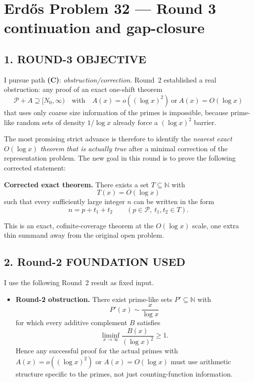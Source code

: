 \section{Erd\H{o}s Problem 32 --- Round 3 continuation and gap-closure}

\subsection{1. ROUND-3 OBJECTIVE}

I pursue path \textbf{(C)}: \emph{obstruction/correction}.  Round~2 established a real obstruction: any proof of an exact one-shift theorem
\[
\mathcal P + A \supseteq [N_0,\infty)
\quad\text{with}\quad A(x)=o((\log x)^2)\ \text{or}\ A(x)=O(\log x)
\]
that uses only coarse size information of the primes is impossible, because prime-like random sets of density $1/\log x$ already force a $(\log x)^2$ barrier.

The most promising strict advance is therefore to identify the \emph{nearest exact $O(\log x)$ theorem that is actually true} after a minimal correction of the representation problem.  The new goal in this round is to prove the following corrected statement:

\medskip
\noindent
\textbf{Corrected exact theorem.}
There exists a set $T\subseteq \mathbb N$ with
\[
T(x)=O(\log x)
\]
such that every sufficiently large integer $n$ can be written in the form
\[
 n=p+t_1+t_2
 \qquad (p\in\mathcal P,\ t_1,t_2\in T).
\]
\medskip

This is an exact, cofinite-coverage theorem at the $O(\log x)$ scale, one extra thin summand away from the original open problem.

\subsection{2. Round-2 FOUNDATION USED}

I use the following Round~2 result as fixed input.

\begin{itemize}
\item \textbf{Round-2 obstruction.} There exist prime-like sets $P'\subseteq \mathbb N$ with
\[
P'(x)\sim \frac{x}{\log x}
\]
for which every additive complement $B$ satisfies
\[
\liminf_{x\to\infty}\frac{B(x)}{(\log x)^2}\ge 1.
\]
Hence any successful proof for the actual primes with $A(x)=o((\log x)^2)$ or $A(x)=O(\log x)$ must use arithmetic structure specific to the primes, not just counting-function information.
\end{itemize}

